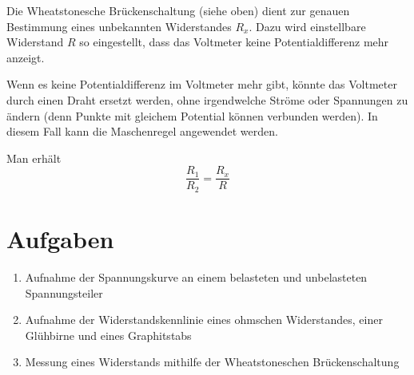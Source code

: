 \documentclass[a4paper,german,12pt,smallheadings]{scrartcl}
\begin{document}
Die Wheatstonesche Brückenschaltung (siehe oben) dient zur genauen Bestimmung
eines unbekannten Widerstandes $R_x$. Dazu wird einstellbare Widerstand $R$ so
eingestellt, dass das Voltmeter keine Potentialdifferenz mehr anzeigt.

Wenn es keine Potentialdifferenz im Voltmeter mehr gibt, könnte das Voltmeter
durch einen Draht ersetzt werden, ohne irgendwelche Ströme oder Spannungen zu
ändern (denn Punkte mit gleichem Potential können verbunden werden). In diesem
Fall kann die Maschenregel angewendet werden.

Man erhält
\begin{equation}
  \frac{R_1}{R_2} = \frac{R_x}{R}
\end{equation}

\section{Aufgaben}

\begin{enumerate}
  \item Aufnahme der Spannungskurve an einem belasteten und unbelasteten Spannungsteiler
  \item Aufnahme der Widerstandskennlinie eines ohmschen Widerstandes, einer Glühbirne und eines Graphitstabs
  \item Messung eines Widerstands mithilfe der Wheatstoneschen Brückenschaltung
\end{enumerate}
\end{document}
